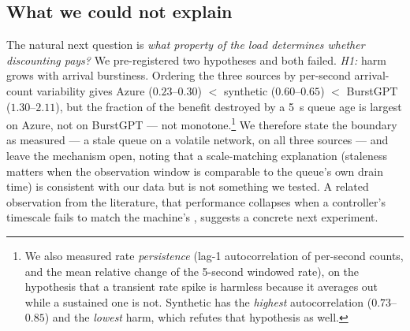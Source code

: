 \subsection{What we could not explain}
The natural next question is \emph{what property of the load determines whether discounting
pays?} We pre-registered two hypotheses and both failed. \emph{H1:} harm grows with arrival
burstiness. Ordering the three sources by per-second arrival-count variability gives Azure
($0.23$--$0.30$) $<$ synthetic ($0.60$--$0.65$) $<$ BurstGPT ($1.30$--$2.11$), but the fraction
of the benefit destroyed by a \SI{5}{\second} queue age is largest on Azure, not on BurstGPT ---
not monotone.\footnote{We also measured rate \emph{persistence} (lag-1 autocorrelation of
per-second counts, and the mean relative change of the 5-second windowed rate), on the hypothesis
that a transient rate spike is harmless because it averages out while a sustained one is not.
Synthetic has the \emph{highest} autocorrelation ($0.73$--$0.85$) and the \emph{lowest} harm,
which refutes that hypothesis as well.} We therefore state the boundary as measured --- a stale
queue on a volatile network, on all three sources --- and leave the mechanism open, noting that
a scale-matching explanation (staleness matters when the observation window is comparable to the
queue's own drain time) is consistent with our data but is not something we tested. A related
observation from the literature, that performance collapses when a controller's timescale fails
to match the machine's \cite{dlfp}, suggests a concrete next experiment.

